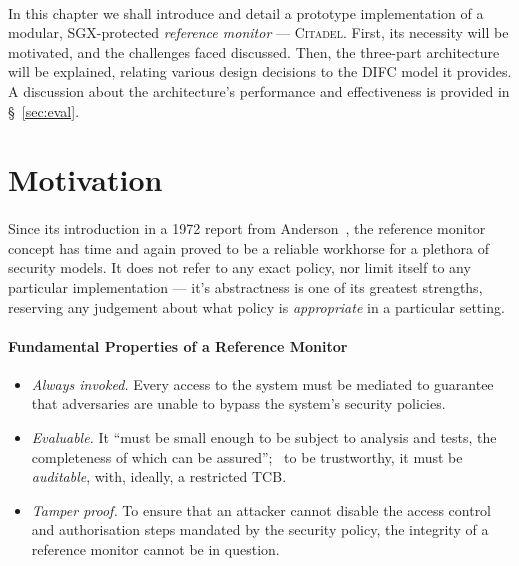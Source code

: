 

\paragraph{} In this chapter we shall introduce and detail a prototype implementation of a modular, SGX-protected \textit{reference monitor} --- \textsc{Citadel}. First, its necessity will be motivated, and the challenges faced discussed. Then, the three-part architecture will be explained, relating various design decisions to the DIFC model it provides. A discussion about the architecture's performance and effectiveness is provided in §~\ref{sec:eval}.

\section{Motivation}
\paragraph{} Since its introduction in a 1972 report from Anderson~\cite{reference-monitor}, the reference monitor concept has time and again proved to be a reliable workhorse for a plethora of security models. It does not refer to any exact policy, nor limit itself to any particular implementation --- it's abstractness is one of its greatest strengths, reserving any judgement about what policy is \textit{appropriate} in a particular setting.~\cite{irvine-rm}

\paragraph{Fundamental Properties of a Reference Monitor}

\begin{itemize}
    \item \textit{Always invoked.} Every access to the system must be mediated to guarantee that adversaries are unable to bypass the system's security policies.
    \item \textit{Evaluable.} It ``must be small enough to be subject to analysis and tests, the completeness of which can be assured'';~\cite{reference-monitor} to be trustworthy, it must be \textit{auditable}, with, ideally, a restricted TCB.
    \item \textit{Tamper proof.} To ensure that an attacker cannot disable the access control and authorisation steps mandated by the security policy, the integrity of a reference monitor cannot be in question.
\end{itemize}

